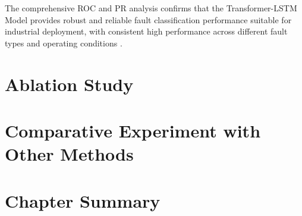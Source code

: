The comprehensive ROC and PR analysis confirms that the Transformer-LSTM Model provides robust and reliable fault classification performance suitable for industrial deployment, with consistent high performance across different fault types and operating conditions \citep{he2009learning, krawczyk2016learning}.

\section{Ablation Study}
\label{sec:experiments:ablation_study}

\section{Comparative Experiment with Other Methods}
\label{sec:experiments:comparative_experiment}

\section{Chapter Summary}
\label{sec:experiments:summary}
